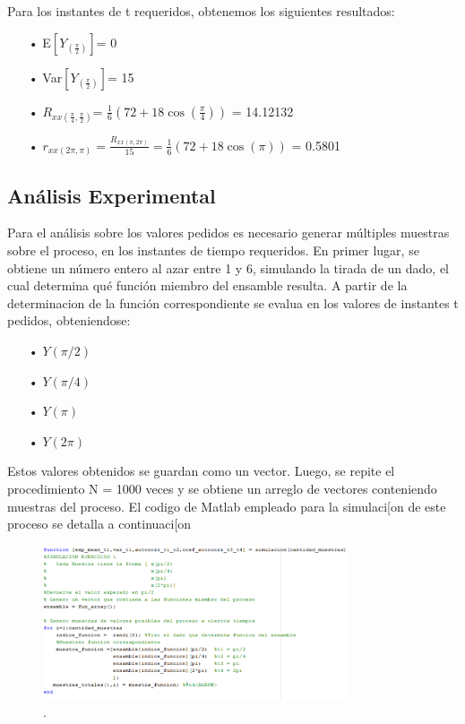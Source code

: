 Para los instantes de t requeridos, obtenemos los siguientes resultados:
\begin{enumerate}
	\item[•]E$\left[ Y_{(\frac{\pi}{2})}\right]$= 0 
	\item[•]Var$\left[Y_{(\frac{\pi}{2})}\right]$= 15
	\item[•]$R_{xx(\frac{\pi}{4},\frac{\pi}{2})}$= $\frac{1}{6} (72 + 18 \cos(\frac{\pi}{4}))$ = 14.12132
	\item[•]$r_{xx(2\pi,\pi)} = \frac{R_{xx(\pi,2\pi)}}{15} = \frac{1}{6} (72 + 18 \cos(\pi))$ = 0.5801
\end{enumerate}

\subsection{Análisis Experimental}

Para el análisis sobre los valores pedidos es necesario generar múltiples muestras sobre el proceso, en los instantes de tiempo requeridos. En primer lugar, se obtiene un número entero al azar entre 1 y 6, simulando la tirada de un dado, el cual determina qué función miembro del ensamble resulta.
A partir de la determinacion de la función correspondiente se evalua en los valores de instantes t pedidos, obteniendose:

\begin{enumerate}
   \item[•] $Y(\pi/2)$
   \item[•] $Y(\pi/4)$
   \item[•] $Y(\pi)$
   \item[•] $Y(2\pi)$
\end{enumerate}

Estos valores obtenidos se guardan como un vector. Luego, se repite el procedimiento N = 1000 veces 
y se obtiene un arreglo de vectores conteniendo muestras del proceso.
El codigo de Matlab empleado para la simulaci[on de este proceso se detalla a continuaci[on 
\\

\begin{figure}[H]
\centering
	\includegraphics[width=0.8\textwidth, trim = {0 0 0 0},clip]{./ImagenesEjercicio1/main1.png}
	\caption{.}
	\label{fig:main1}
\end{figure}

